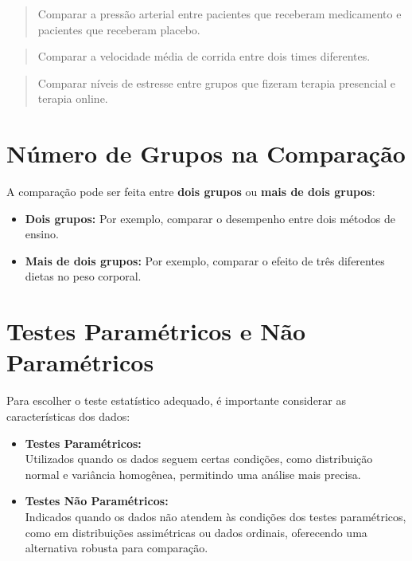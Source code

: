 \documentclass[
]{book}
\providecommand{\tightlist}{%
  \setlength{\itemsep}{0pt}\setlength{\parskip}{0pt}}
\begin{document}
\begin{quote}
Comparar a pressão arterial entre pacientes que receberam medicamento e pacientes que receberam placebo.
\end{quote}

\begin{quote}
Comparar a velocidade média de corrida entre dois times diferentes.
\end{quote}

\begin{quote}
Comparar níveis de estresse entre grupos que fizeram terapia presencial e terapia online.
\end{quote}

\section{Número de Grupos na Comparação}\label{nuxfamero-de-grupos-na-comparauxe7uxe3o}

A comparação pode ser feita entre \textbf{dois grupos} ou \textbf{mais de dois grupos}:

\begin{itemize}
\tightlist
\item
  \textbf{Dois grupos:} Por exemplo, comparar o desempenho entre dois métodos de ensino.
\item
  \textbf{Mais de dois grupos:} Por exemplo, comparar o efeito de três diferentes dietas no peso corporal.
\end{itemize}

\section{Testes Paramétricos e Não Paramétricos}\label{testes-paramuxe9tricos-e-nuxe3o-paramuxe9tricos}

Para escolher o teste estatístico adequado, é importante considerar as características dos dados:

\begin{itemize}
\item
  \textbf{Testes Paramétricos:}\\
  Utilizados quando os dados seguem certas condições, como distribuição normal e variância homogênea, permitindo uma análise mais precisa.
\item
  \textbf{Testes Não Paramétricos:}\\
  Indicados quando os dados não atendem às condições dos testes paramétricos, como em distribuições assimétricas ou dados ordinais, oferecendo uma alternativa robusta para comparação.
\end{itemize}
\end{document}
